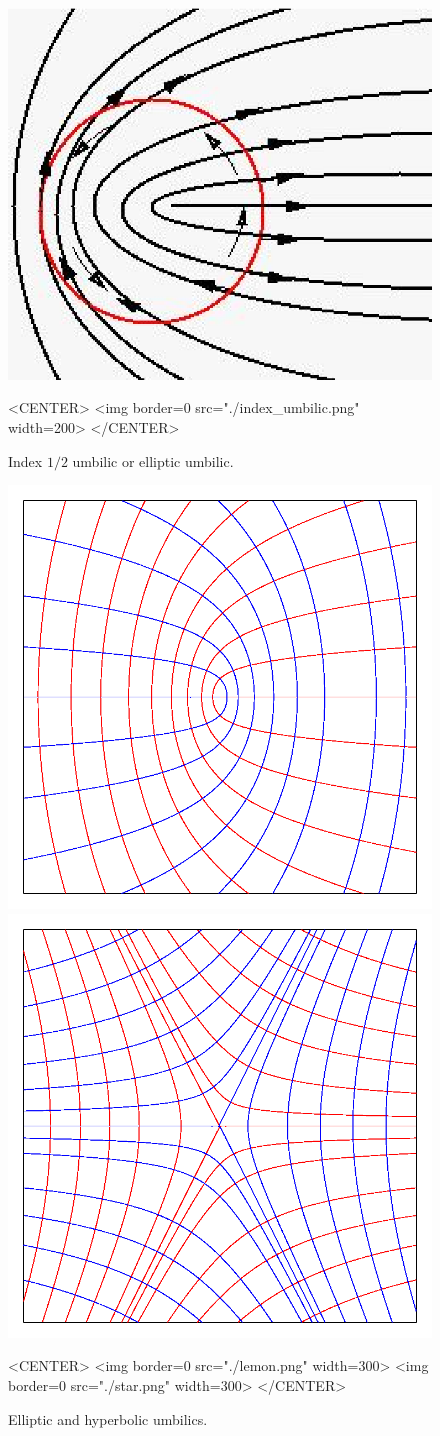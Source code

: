 \begin{figure}[!ht]
\begin{ccTexOnly}
\centerline{
\includegraphics[width=.5\linewidth]{Ridges_3/index_umbilic}}
\end{ccTexOnly}
\caption{Index $1/2$ umbilic or elliptic umbilic.}
\label{index_umbilic}
\begin{ccHtmlOnly}
<CENTER> <img border=0 src="./index_umbilic.png" width=200>
</CENTER>
\end{ccHtmlOnly}
\end{figure}


\begin{figure}[!ht]
\begin{ccTexOnly}
\centerline{
\includegraphics[width=.5\linewidth]{Ridges_3/lemon}
\includegraphics[width=.5\linewidth]{Ridges_3/star}}
\end{ccTexOnly}
\caption{Elliptic and hyperbolic umbilics.}
\label{umbilics}
\begin{ccHtmlOnly}
<CENTER> <img border=0 src="./lemon.png" width=300>
 <img border=0 src="./star.png" width=300>
</CENTER>
\end{ccHtmlOnly}
\end{figure}



